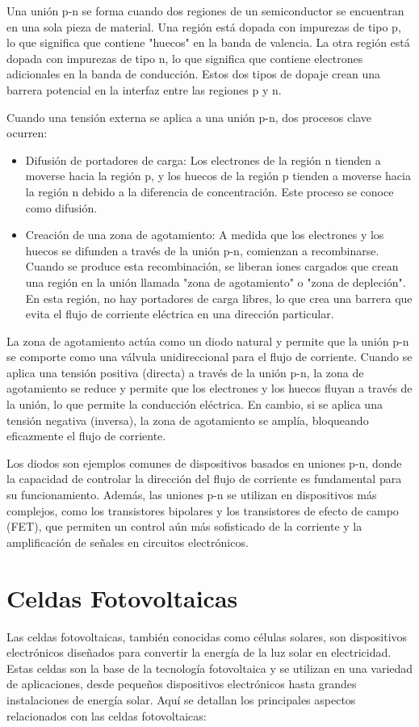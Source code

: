 \documentclass[10.5pt]{article}
\begin{document}
    Una unión p-n se forma cuando dos regiones de un semiconductor se encuentran en una sola pieza de material. Una región está dopada con impurezas de tipo p, lo que significa que contiene "huecos" en la banda de valencia. La otra región está dopada con impurezas de tipo n, lo que significa que contiene electrones adicionales en la banda de conducción. Estos dos tipos de dopaje crean una barrera potencial en la interfaz entre las regiones p y n.

    Cuando una tensión externa se aplica a una unión p-n, dos procesos clave ocurren:
    \begin{itemize}
        \item Difusión de portadores de carga: Los electrones de la región n tienden a moverse hacia la región p, y los huecos de la región p tienden a moverse hacia la región n debido a la diferencia de concentración. Este proceso se conoce como difusión.
        \item Creación de una zona de agotamiento: A medida que los electrones y los huecos se difunden a través de la unión p-n, comienzan a recombinarse. Cuando se produce esta recombinación, se liberan iones cargados que crean una región en la unión llamada "zona de agotamiento" o "zona de depleción". En esta región, no hay portadores de carga libres, lo que crea una barrera que evita el flujo de corriente eléctrica en una dirección particular.
    \end{itemize}
    La zona de agotamiento actúa como un diodo natural y permite que la unión p-n se comporte como una válvula unidireccional para el flujo de corriente. Cuando se aplica una tensión positiva (directa) a través de la unión p-n, la zona de agotamiento se reduce y permite que los electrones y los huecos fluyan a través de la unión, lo que permite la conducción eléctrica. En cambio, si se aplica una tensión negativa (inversa), la zona de agotamiento se amplía, bloqueando eficazmente el flujo de corriente.

    Los diodos son ejemplos comunes de dispositivos basados en uniones p-n, donde la capacidad de controlar la dirección del flujo de corriente es fundamental para su funcionamiento. Además, las uniones p-n se utilizan en dispositivos más complejos, como los transistores bipolares y los transistores de efecto de campo (FET), que permiten un control aún más sofisticado de la corriente y la amplificación de señales en circuitos electrónicos.
    \section{Celdas Fotovoltaicas}
    Las celdas fotovoltaicas, también conocidas como células solares, son dispositivos electrónicos diseñados para convertir la energía de la luz solar en electricidad. Estas celdas son la base de la tecnología fotovoltaica y se utilizan en una variedad de aplicaciones, desde pequeños dispositivos electrónicos hasta grandes instalaciones de energía solar. Aquí se detallan los principales aspectos relacionados con las celdas fotovoltaicas:
\end{document}
